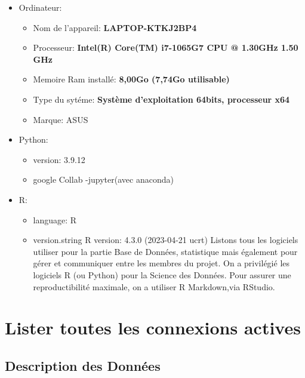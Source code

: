\documentclass[mstat,12pt]{unswthesis}
\begin{document}
\begin{itemize}
\item
  Ordinateur:

  \begin{itemize}
  \tightlist
  \item
    Nom de l'appareil: \textbf{LAPTOP-KTKJ2BP4}
  \item
    Processeur: \textbf{Intel(R) Core(TM) i7-1065G7 CPU @ 1.30GHz 1.50
    GHz}
  \item
    Memoire Ram installé: \textbf{8,00Go (7,74Go utilisable)}
  \item
    Type du sytéme: \textbf{Système d'exploitation 64bits, processeur
    x64}
  \item
    Marque: ASUS
  \end{itemize}
\item
  Python:

  \begin{itemize}
  \tightlist
  \item
    version: 3.9.12
  \item
    google Collab -jupyter(avec anaconda)
  \end{itemize}
\item
  R:

  \begin{itemize}
  \tightlist
  \item
    language: R\\
  \item
    version.string R version: 4.3.0 (2023-04-21 ucrt) Listons tous les
    logiciels utiliser pour la partie Base de Données, statistique mais
    également pour gérer et communiquer entre les membres du projet.
    \medskip On a privilégié les logiciels R (ou Python) pour la Science
    des Données. Pour assurer une reproductibilité maximale, on a
    utiliser R Markdown,via RStudio. \bigskip
  \end{itemize}
\end{itemize}

\hypertarget{lister-toutes-les-connexions-actives}{%
\chapter{Lister toutes les connexions
actives}\label{lister-toutes-les-connexions-actives}}

\hypertarget{description-des-donnuxe9es}{%
\section{Description des Données}\label{description-des-donnuxe9es}}
\end{document}
